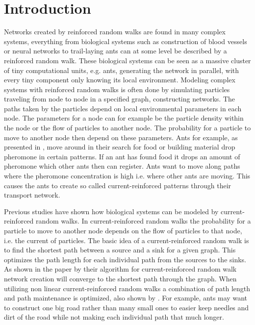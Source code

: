 \section{Introduction}
\label{sec:introduction}
Networks created by reinforced random walks are found in many complex systems, everything from biological systems such as construction of blood vessels or neural networks to trail-laying ants can at some level be described by a reinforced random walk. These biological systems can be seen as a massive cluster of tiny computational units, e.g. ants, generating the network in parallel, with every tiny component only knowing its local environment. Modeling complex systems with reinforced random walks is often done by simulating particles traveling from node to node in a specified graph, constructing networks. The paths taken by the particles depend on local environmental parameters in each node. The parameters for a node can for example be the particle density within the node or the flow of particles to another node. The probability for a particle to move to another node then depend on these parameters. Ants for example, as presented in \cite{Schweitzer1997153}, move around in their search for food or building material drop pheromone in certain patterns. If an ant has found food it drops an amount of pheromone which other ants then can register. Ants want to move along paths where the pheromone concentration is high i.e. where other ants are moving. This causes the ants to create so called current-reinforced patterns through their transport network.

Previous studies have shown how biological systems can be modeled by current-reinforced random walks. In current-reinforced random walks the probability for a particle to move to another node depends on the flow of particles to that node, i.e. the current of particles. The basic idea of a current-reinforced random walk is to find the shortest path between a source and a sink for a given graph. This optimizes the path length for each individual path from the sources to the sinks. As shown in the paper by \cite{Current} their algorithm for current-reinforced random walk network creation will converge to the shortest path through the graph. When utilizing non linear current-reinforced random walks a combination of path length and path maintenance is optimized, also shown by \cite{Current}. For example, ants may want to construct one big road rather than many small ones to easier keep needles and dirt of the road while not making each individual path that much longer.

